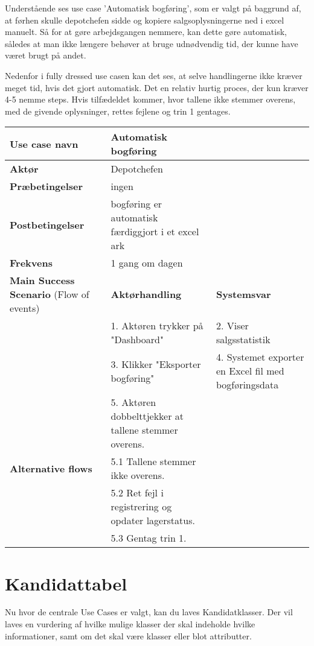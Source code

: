 Understående ses use case 'Automatisk bogføring', som er valgt på baggrund af, at førhen skulle depotchefen sidde og kopiere salgsoplysningerne ned i excel manuelt. Så for at gøre arbejdsgangen nemmere, kan dette gøre automatisk, således at man ikke længere behøver at bruge udnødvendig tid, der kunne have været brugt på andet. 

Nedenfor i fully dressed use casen kan det ses, at selve handlingerne ikke kræver meget tid, hvis det gjort automatisk. Det en relativ hurtig proces, der kun kræver 4-5 nemme steps. 
Hvis tilfædeldet kommer, hvor tallene ikke stemmer overens, med de givende oplysninger, rettes fejlene og trin 1 gentages. 

\begin{longtable}{ |p{120pt}|p{120pt}|p{120pt}| }
    \hline
    \textbf{Use case navn} & Automatisk bogføring & \\
    \hline
    \textbf{Aktør} & Depotchefen & \\
    \hline
    \textbf{Præbetingelser} & ingen & \\
    \hline
    \textbf{Postbetingelser} & bogføring er automatisk færdiggjort i et excel ark & \\
    \hline
    \textbf{Frekvens} & 1 gang om dagen & \\
    \hline
    \textbf{Main Success Scenario} (Flow of events) & \textbf{Aktørhandling} & \textbf{Systemsvar} \\
    \hline
    & 1. Aktøren trykker på "Dashboard" & 2. Viser salgsstatistik \\
    \hline
    & 3. Klikker "Eksporter bogføring" & 4. Systemet exporter en Excel fil med bogføringsdata \\
    \hline
    & 5. Aktøren dobbelttjekker at tallene stemmer overens. & \\
    \hline
    \textbf{Alternative flows} & 5.1 Tallene stemmer ikke overens. & \\
    \hline 
    & 5.2 Ret fejl i registrering og opdater lagerstatus. & \\
    \hline
    & 5.3 Gentag trin 1. & \\
    \hline
\end{longtable}

\section{Kandidattabel}
Nu hvor de centrale Use Cases er valgt, kan du laves Kandidatklasser. Der vil laves en vurdering af hvilke mulige klasser der skal indeholde hvilke informationer, samt om det skal være klasser eller blot attributter. 

